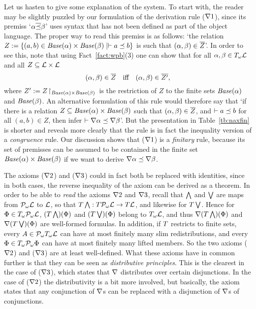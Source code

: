 \documentclass{book}
\begin{document}
Let us hasten to give some explanation of the system.  To start with,
the reader may be slightly puzzled by our formulation of the
derivation rule ($\nabla1$), since its premiss
`$\alpha\overline{\preceq}\beta$' uses syntax that has not been
defined as part of the object language.  The proper way to read this
premiss is as follows: `the relation $Z := \{ (a,b) \in
\mathit{Base}(\alpha) \times \mathit{Base}(\beta) \mid \vdash a \preceq b
\}$ is such that $(\alpha,\beta)\in \overline{Z}$'.  In order to see
this, note that using Fact~\ref{fact:wpb}(3) one can show that for all
$\alpha,\beta \in T_{\omega} \mathcal{L}$ and all $Z \subseteq \mathcal{L}
\times \mathcal{L}$
\[ 
(\alpha,\beta) \in \overline{Z} \quad \mbox{iff} \quad 
(\alpha,\beta) \in \overline{Z'}, 
\]    
where $Z' := Z\!\upharpoonright_{\mathit{Base}(\alpha) \times \mathit{Base}(\beta)}\,$ is
the restriction of $Z$ to the finite sets $\mathit{Base}(\alpha)$ and
$\mathit{Base}(\beta)$.  An alternative formulation of this rule would
therefore say that `if there is a relation $Z \subseteq
\mathit{Base}(\alpha) \times \mathit{Base}(\beta)$ such that $(\alpha,\beta)
\in \overline{Z}$, and $\vdash a \preceq b$ for all $(a,b) \in Z$,
then infer $\vdash \nabla\alpha\preceq\nabla\beta$'.  But the
presentation in Table~\ref{tb:naxfin} is shorter and reveals more
clearly that the rule is in fact the inequality version of a
\emph{congruence} rule.  Our discussion shows that ($\nabla1$) is a
\emph{finitary} rule, because its set of premisses can be assumed to
be contained in the finite set $\mathit{Base}(\alpha) \times
\mathit{Base}(\beta)$ if we want to derive $\nabla \alpha \preceq
\nabla \beta$.



The axioms ($\nabla2$) and ($\nabla3$) could in fact both be
replaced with identities, since in both cases, the reverse inequality
of the axiom can be derived as a theorem.  In order to be able to
\emph{read} the axioms $\nabla2$ and $\nabla3$, recall that
$\bigwedge$ and $\bigvee$ are maps from $\mathcal{P}_{\omega}\mathcal{L}$ to
$\mathcal{L}$, so that $T\bigwedge: T\mathcal{P}_{\omega}\mathcal{L} \to
T\mathcal{L}$, and likewise for $T\bigvee$.  Hence for $\Phi
\in T_{\omega}\mathcal{P}_{\omega}\mathcal{L}$, $(T\bigwedge)(\Phi)$ and
$(T\bigvee)(\Phi)$ belong to $T_{\omega}\mathcal{L}$, and thus
$\nabla(T\bigwedge)(\Phi)$ and $\nabla(T\bigvee)(\Phi)$ are
well-formed formulas.  In addition, if $T$ restricts to finite
sets, every $A \in \mathcal{P}_{\omega}T_{\omega} \mathcal{L}$ can have at most
finitely many slim redistributions, and every
$\Phi\in T_{\omega}\mathcal{P}_{\omega}\Phi$ can have at most finitely many lifted
members.  So the two axioms ($\nabla2$) and ($\nabla3$) are at least
well-defined.  What these axioms have in common further is that they
can be seen as \emph{distributive principles}.  This is the clearest
in the case of ($\nabla3$), which states that $\nabla$ distributes
over certain disjunctions.  In the case of ($\nabla2$) the
distributivity is a bit more involved, but basically, the axiom states
that any conjunction of $\nabla$s can be replaced with a disjunction
of $\nabla$s of conjunctions.
\end{document}
